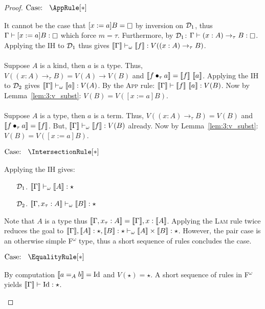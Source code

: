 \begin{proof}
    $\text{Case: }\begin{array}{c} \AppRule[*] \end{array}$
    \begin{proofcase}
        It cannot be the case that $[x := a]B = \kind$ by inversion on $\mathcal{D}_{1}$, thus $\Gamma \vdash [x := a]B : \kind$ which force $m = \tau$.
        Furthermore, by $\mathcal{D}_{1}$: $\Gamma \vdash (x : A) \to_\tau B : \kind$.
        Applying the IH to $\mathcal{D}_{1}$ thus gives $\llbracket \Gamma \rrbracket \vdash_\omega \llbracket f \rrbracket : V((x : A) \to_\tau B)$.
        \\ \\
        Suppose $A$ is a kind, then $a$ is a type.
        Thus, $V((x : A) \to_\tau B) = V(A) \to V(B)$ and $\sema{\app{f}{\tau}{a}} = \sema{f}\ \sema{a}$.
        Applying the IH to $\mathcal{D}_{2}$ gives $\llbracket \Gamma \rrbracket \vdash_\omega \llbracket a \rrbracket : V(A)$.
        By the \textsc{App} rule: $\llbracket \Gamma \rrbracket \vdash \llbracket f \rrbracket\ \llbracket a \rrbracket : V(B)$.
        Now by Lemma~\ref{lem:3:v_subst}: $V(B) = V([x := a]B)$.
        \\ \\
        Suppose $A$ is a type, then $a$ is a term.
        Thus, $V((x : A) \to_\tau B) = V(B)$ and $\llbracket f \bullet_{\tau} a \rrbracket = \llbracket f \rrbracket$.
        But, $\llbracket \Gamma \rrbracket \vdash_\omega \llbracket f \rrbracket : V(B)$ already.
        Now by Lemma~\ref{lem:3:v_subst}: $V(B) = V([x := a]B)$.
    \end{proofcase}

    $\text{Case: }\begin{array}{c} \IntersectionRule[*] \end{array}$
    \begin{proofcase}
        Applying the IH gives:
        \begin{enumerate}
            \item[$\mathcal{D}_{1}$.] $\llbracket \Gamma \rrbracket \vdash_\omega \llbracket A \rrbracket : \star$
            \item[$\mathcal{D}_{2}$.] $\llbracket \Gamma, x_\tau : A \rrbracket \vdash_\omega \llbracket B \rrbracket : \star$ 
        \end{enumerate}
        Note that $A$ is a type thus $\llbracket \Gamma, x_\tau : A \rrbracket = \llbracket \Gamma \rrbracket, x : \llbracket A \rrbracket$.
        Applying the \textsc{Lam} rule twice reduces the goal to $\llbracket \Gamma \rrbracket, \llbracket A \rrbracket : \star, \llbracket B \rrbracket : \star \vdash_\omega \llbracket A \rrbracket \times \llbracket B \rrbracket : \star$.
        However, the pair case is an otherwise simple F$^\omega$ type, thus a short sequence of rules concludes the case.
    \end{proofcase}

    $\text{Case: }\begin{array}{c} \EqualityRule[*] \end{array}$
    \begin{proofcase}
        By computation $\llbracket a =_A b \rrbracket = \textnormal{Id}$ and $V(\star) = \star$.
        A short sequence of rules in F$^\omega$ yields $\llbracket \Gamma \rrbracket \vdash \textnormal{Id} : \star$.
    \end{proofcase}


\end{proof}
